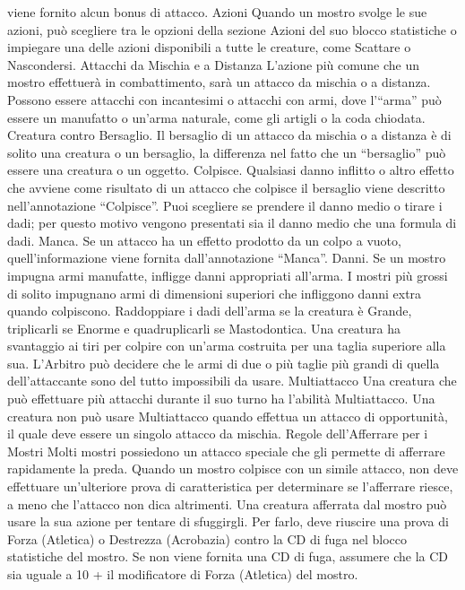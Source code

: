 \begin{multicols}{2}
viene fornito alcun bonus di attacco.
Azioni
Quando un mostro svolge le sue azioni, può scegliere tra
le opzioni della sezione Azioni del suo blocco statistiche o
impiegare una delle azioni disponibili a tutte le creature,
come Scattare o Nascondersi.
Attacchi da Mischia e a Distanza
L’azione più comune che un mostro effettuerà in
combattimento, sarà un attacco da mischia o a
distanza. Possono essere attacchi con incantesimi o
attacchi con armi, dove l’“arma” può essere un
manufatto o un’arma naturale, come gli artigli o la coda
chiodata.
Creatura contro Bersaglio. Il bersaglio di un attacco
da mischia o a distanza è di solito una creatura o un
bersaglio, la differenza nel fatto che un “bersaglio” può
essere una creatura o un oggetto.
Colpisce. Qualsiasi danno inflitto o altro effetto che
avviene come risultato di un attacco che colpisce il
bersaglio viene descritto nell’annotazione “Colpisce”.
Puoi scegliere se prendere il danno medio o tirare i
dadi; per questo motivo vengono presentati sia il danno
medio che una formula di dadi.
Manca. Se un attacco ha un effetto prodotto da un
colpo a vuoto, quell’informazione viene fornita
dall’annotazione “Manca”.
Danni. Se un mostro impugna armi manufatte, infligge
danni appropriati all’arma. I mostri più grossi di solito
impugnano armi di dimensioni superiori che infliggono
danni extra quando colpiscono. Raddoppiare i dadi
dell’arma se la creatura è Grande, triplicarli se Enorme
e quadruplicarli se Mastodontica.
Una creatura ha svantaggio ai tiri per colpire con un’arma
costruita per una taglia superiore alla sua. L’Arbitro può
decidere che le armi di due o più taglie più grandi di quella
dell’attaccante sono del tutto impossibili da usare.
Multiattacco
Una creatura che può effettuare più attacchi durante il
suo turno ha l’abilità Multiattacco. Una creatura non può
usare Multiattacco quando effettua un attacco di
opportunità, il quale deve essere un singolo attacco da
mischia.
Regole dell’Afferrare per i Mostri
Molti mostri possiedono un attacco speciale che gli permette di
afferrare rapidamente la preda. Quando un mostro colpisce con
un simile attacco, non deve effettuare un’ulteriore prova di
caratteristica per determinare se l’afferrare riesce, a meno che
l’attacco non dica altrimenti.
Una creatura afferrata dal mostro può usare la sua azione per
tentare di sfuggirgli. Per farlo, deve riuscire una prova di Forza
(Atletica) o Destrezza (Acrobazia) contro la CD di fuga nel
blocco statistiche del mostro. Se non viene fornita una CD di
fuga, assumere che la CD sia uguale a 10 + il modificatore di
Forza (Atletica) del mostro.

\end{multicols}
